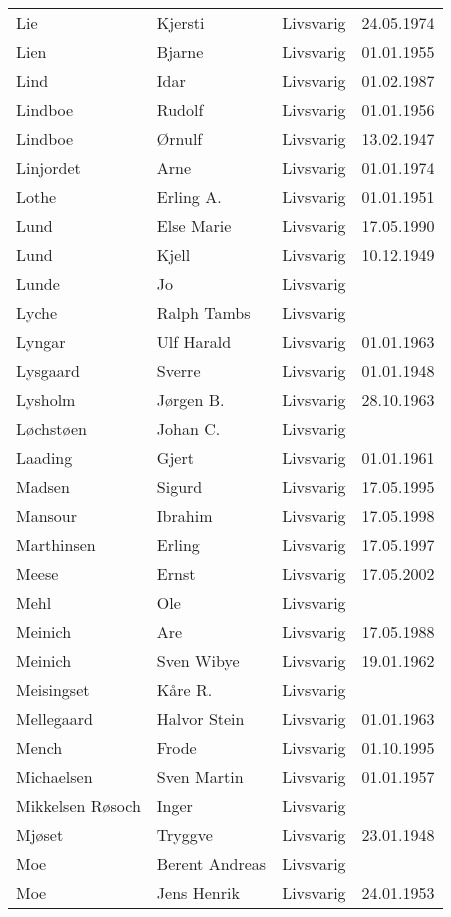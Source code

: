 \begin{longtable}{llll}
Lie	&	Kjersti	&	Livsvarig 	&	24.05.1974	\\
Lien	&	Bjarne	&	Livsvarig 	&	01.01.1955	\\
Lind	&	Idar	&	Livsvarig 	&	01.02.1987	\\
Lindboe	&	Rudolf	&	Livsvarig 	&	01.01.1956	\\
Lindboe	&	Ørnulf	&	Livsvarig 	&	13.02.1947	\\
Linjordet	&	Arne	&	Livsvarig 	&	01.01.1974	\\
Lothe	&	Erling A.	&	Livsvarig 	&	01.01.1951	\\
Lund	&	Else Marie	&	Livsvarig 	&	17.05.1990	\\
Lund	&	Kjell	&	Livsvarig 	&	10.12.1949	\\
Lunde	&	Jo	&	Livsvarig 	&		\\
Lyche	&	Ralph Tambs	&	Livsvarig 	&		\\
Lyngar	&	Ulf Harald	&	Livsvarig 	&	01.01.1963	\\
Lysgaard	&	Sverre	&	Livsvarig 	&	01.01.1948	\\
Lysholm	&	Jørgen B.	&	Livsvarig 	&	28.10.1963	\\
Løchstøen	&	Johan C.	&	Livsvarig 	&		\\
Laading	&	Gjert	&	Livsvarig 	&	01.01.1961	\\
Madsen 	&	Sigurd 	&	Livsvarig 	&	17.05.1995	\\
Mansour 	&	Ibrahim	&	Livsvarig	&	17.05.1998	\\
Marthinsen 	&	Erling	&	Livsvarig	&	17.05.1997	\\
Meese 	&	Ernst	&	Livsvarig	&	17.05.2002	\\
Mehl	&	Ole	&	Livsvarig 	&		\\
Meinich	&	Are	&	Livsvarig 	&	17.05.1988	\\
Meinich	&	Sven Wibye	&	Livsvarig 	&	19.01.1962	\\
Meisingset	&	Kåre R.	&	Livsvarig 	&		\\
Mellegaard	&	Halvor Stein	&	Livsvarig 	&	01.01.1963	\\
Mench 	&	Frode	&	Livsvarig	&	01.10.1995	\\
Michaelsen	&	Sven Martin	&	Livsvarig 	&	01.01.1957	\\
Mikkelsen Røsoch	&	Inger	&	Livsvarig 	&		\\
Mjøset	&	Tryggve	&	Livsvarig 	&	23.01.1948	\\
Moe	&	Berent Andreas	&	Livsvarig 	&		\\
Moe	&	Jens Henrik	&	Livsvarig 	&	24.01.1953	\\

\end{longtable}
